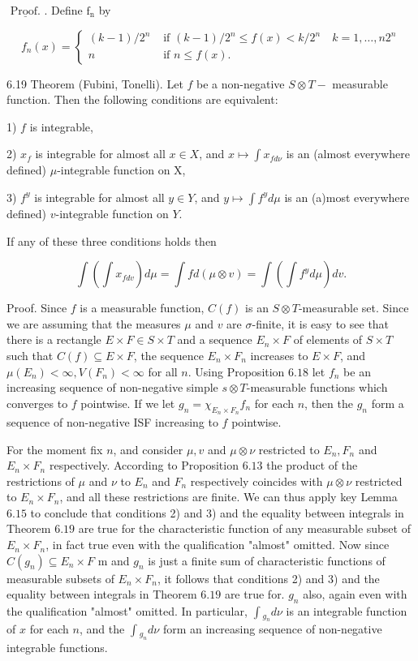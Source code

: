 {{{$\underline{\text { Proof. }}$. Define $\mathrm{f}_{\mathrm{n}}$ by

$$
f_{n}(x)= \begin{cases}(k-1) / 2^{n} & \text { if }(k-1) / 2^{n} \leq f(x)<k / 2^{n} \quad k=1, \ldots, n 2^{n} \\ n & \text { if } n \leq f(x) .\end{cases}
$$

6.19 Theorem (Fubini, Tonelli). Let $f$ be a non-negative $S \otimes T-$ measurable function. Then the following conditions are equivalent:

1) $f$ is integrable,

2) $x_{f}$ is integrable for almost all $x \in X$, and $x \mapsto \int x_{f d \nu}$ is an (almost everywhere defined) $\mu$-integrable function on $\mathrm{X}$,

3) $f^{y}$ is integrable for almost all $y \in Y$, and $y \mapsto \int f^{y} d \mu$ is an (a)most everywhere defined) $v$-integrable function on $Y$.

If any of these three conditions holds then

$$
\int\left(\int x_{f d v}\right) d \mu=\int f d(\mu \otimes v)=\int\left(\int f^{y} d \mu\right) d v .
$$

Proof. Since $f$ is a measurable function, $C(f)$ is an $S \otimes T$-measurable set. Since we are assuming that the measures $\mu$ and $v$ are $\sigma$-finite, it is easy to see that there is a rectangle $E \times F \in S \times T$ and a sequence $E_{n} \times F$ of elements of $S \times T$ such that $C(f) \subseteq E \times F$, the sequence $E_{n} \times F_{n}$ increases to $E \times F$, and $\mu\left(E_{n}\right)<\infty, V\left(F_{n}\right)<\infty$ for all $n$. Using Proposition $6.18$ let $f_{n}$ be an increasing sequence of non-negative simple $s \otimes T$-measurable functions which converges to $f$ pointwise. If we let $g_{n}=\chi_{E_{n} \times F_{n}} f_{n}$ for each $n$, then the $g_{n}$ form a sequence of non-negative ISF increasing to $f$ pointwise.

For the moment fix $n$, and consider $\mu, v$ and $\mu \otimes \nu$ restricted to $E_{n}, F_{n}$ and $E_{n} \times F_{n}$ respectively. According to Proposition $6.13$ the product of the restrictions of $\mu$ and $\nu$ to $E_{n}$ and $F_{n}$ respectively coincides with $\mu \otimes \nu$ restricted to $E_{n} \times F_{n}$, and all these restrictions are finite. We can thus apply key Lemma $6.15$ to conclude that conditions 2) and 3) and the equality between integrals in Theorem $6.19$ are true for the characteristic function of any measurable subset of $E_{n} \times F_{n}$, in fact true even with the qualification "almost" omitted. Now since $C\left(g_{n}\right) \subseteq E_{n} \times F$ m and $g_{n}$ is just a finite sum of characteristic functions of measurable subsets of $E_{n} \times F_{n}$, it follows that conditions 2) and 3) and the equality between integrals in Theorem $6.19$ are true for. $g_{n}$ also, again even with the qualification "almost" omitted. In particular, $\int{ }_{g_{n}} d \nu$ is an integrable function of $x$ for each $n$, and the $\int{ }_{g_{n}} d \nu$ form an increasing sequence of non-negative integrable functions.

}}}
